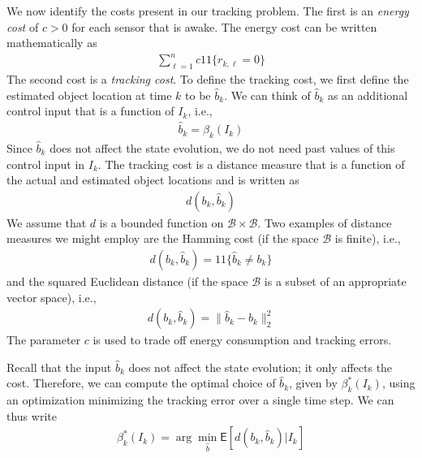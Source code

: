 \documentclass[journal,draftcls,onecolumn,11pt]{IEEEtran}
\newcommand{\Expect}{\textsf{E}}
\newcommand{\indic}[1]{\mbox{$1\!\!1$}{\{#1\}}}
\begin{document}
We now identify the costs present in our tracking problem.  The first is an {\em energy cost} of $c > 0$ for each sensor that is awake.  The energy cost can be written mathematically as
\begin{align}
   \sum_{\ell=1}^n c \indic{r_{k,\ell} = 0}
\end{align}
The second cost is a {\em tracking cost}.  To define the tracking cost, we first define the estimated object location at time $k$ to be $\hat{b}_k$.  We can think of $\hat{b}_k$ as an additional control input that is a function of $I_k$, i.e.,
\begin{align} \label{eq:betakh}
   \hat{b}_k = \beta_k(I_k)
\end{align}
Since $\hat{b}_k$ does not affect the state evolution, we do not need past values of this control input in $I_k$.  The tracking cost is a distance measure that is a function of the actual and estimated object locations and is written as
\begin{align}
   d(b_k,\hat{b}_k)
\end{align}
We assume that $d$ is a bounded function on $\mathcal{B} \times \mathcal{B}$.  Two examples of distance measures we might employ are the Hamming cost (if the space $\mathcal{B}$ is finite), i.e.,
\begin{align}
   d(b_k,\hat{b}_k) = \indic{\hat{b}_k \neq b_k}
\end{align}
and the squared Euclidean distance (if the space $\mathcal{B}$ is a subset of an appropriate vector space), i.e.,
\begin{align}
   d(b_k,\hat{b}_k) = \| \hat{b}_k - b_k \|_2^2
\end{align}
The parameter $c$ is used to trade off energy consumption and tracking errors.

Recall that the input $\hat{b}_k$ does not affect the state evolution; it only affects the cost. Therefore, we can compute the optimal choice of $\hat{b}_k$, given by $\beta_k^*(I_k)$, using an optimization minimizing the tracking error over a single time step.  We can thus write
\begin{align}
   \beta_k^*(I_k) = \arg \min_{\hat{b}} \Expect\left[
      d(b_k,\hat{b}_k)
   \Big|I_k \right]
\end{align}
\end{document}
